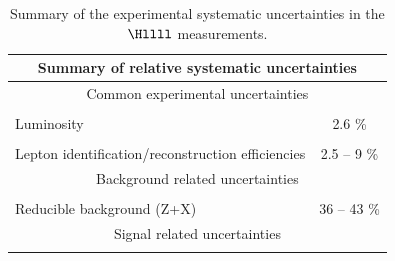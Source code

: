 \begin{table}[!htb]
\begin{center}
\small
\caption{
Summary of the experimental systematic uncertainties in the $\Hllll$ measurements. %
\label{tab:SystOverview}
}
\begin{tabular}{|lc|} 
\hline %
\hline %
\multicolumn{2}{|c|}{\textbf{Summary of relative systematic uncertainties}} \\
\hline %
\hline %
\multicolumn{2}{|c|}{Common experimental uncertainties} \\
\hline %
\vspace{-0.4cm} & \\
Luminosity & 2.6 \%  \\ 
\vspace{-0.4cm} & \\
Lepton identification/reconstruction efficiencies & 2.5 -- 9 \% \\ 
\hline %
\hline %
\multicolumn{2}{|c|}{Background related uncertainties} \\
\hline %
\vspace{-0.4cm} & \\
Reducible background (Z+X) & 36 -- 43 \% \\ 
\hline %
\hline %
\multicolumn{2}{|c|}{Signal related uncertainties} \\
\hline %
\vspace{-0.4cm} & \\

\end{tabular}
\end{center}
\end{table}
